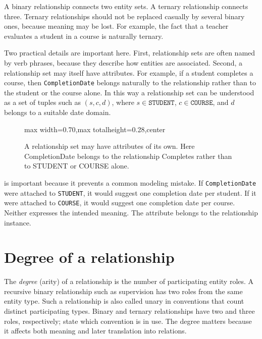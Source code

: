 \documentclass[11pt,a4paper,openany]{book}
\begin{document}
A binary relationship connects two entity sets. A ternary relationship connects three. Ternary relationships should not be replaced casually by several binary ones, because meaning may be lost. For example, the fact that a teacher evaluates a student in a course is naturally ternary.

Two practical details are important here. First, relationship sets are often named by verb phrases, because they describe how entities are associated. Second, a relationship set may itself have attributes. For example, if a student completes a course, then \texttt{CompletionDate} belongs naturally to the relationship rather than to the student or the course alone. In this way a relationship set can be understood as a set of tuples such as \((s,c,d)\), where \(s \in \texttt{STUDENT}\), \(c \in \texttt{COURSE}\), and \(d\) belongs to a suitable date domain.

\begin{figure}[tbp]
\centering
\begin{adjustbox}{max width=0.70\linewidth,max totalheight=0.28\textheight,center}
\end{adjustbox}
\caption{A relationship set may have attributes of its own. Here CompletionDate belongs to the relationship Completes rather than to STUDENT or COURSE alone.}
\label{fig:er-relationship-attribute}
\end{figure}

 is important because it prevents a common modeling mistake. If \texttt{Completion\allowbreak Date} were attached to \texttt{STUDENT}, it would suggest one completion date per student. If it were attached to \texttt{COURSE}, it would suggest one completion date per course. Neither expresses the intended meaning. The attribute belongs to the relationship instance.

\section{Degree of a relationship}
The \emph{degree} (arity) of a relationship is the number of participating entity roles. A recursive binary relationship such as supervision has two roles from the same entity type. Such a relationship is also called unary in conventions that count distinct participating types. Binary and ternary relationships have two and three roles, respectively; state which convention is in use. The degree matters because it affects both meaning and later translation into relations.
\end{document}
